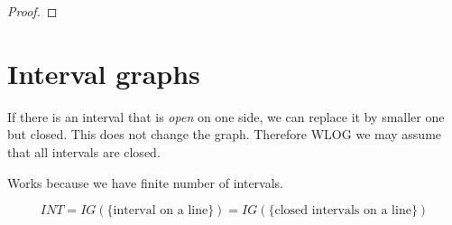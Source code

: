 \begin{proof}

\end{proof}

\section{\texorpdfstring{Interval graphs}{Interval graphs}}
\vspace{5mm}
\large

If there is an interval that is \emph{open} on one side, we can replace it by smaller one but closed.
This does not change the graph.
Therefore WLOG we may assume that all intervals are closed.

Works because we have finite number of intervals.

\begin{definition}
	\[ INT = IG(\{\text{interval on a line}\}) = IG(\{\text{closed intervals on a line}\}) \]
\end{definition}

